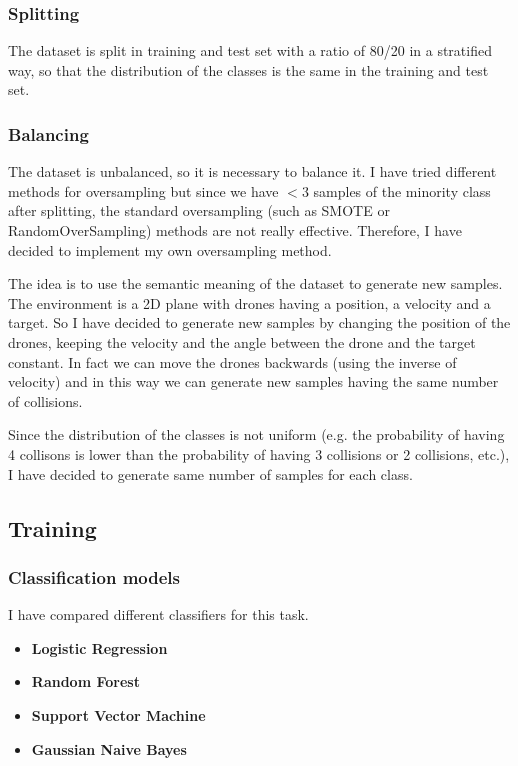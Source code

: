 \subsubsection{Splitting}
\label{sec:preprocessing-splitting}
The dataset is split in training and test set with a ratio of 80/20 in a stratified way, so that the distribution of the classes is the same in the training and test set.

\subsubsection{Balancing}
\label{sec:preprocessing-balancing}
The dataset is unbalanced, so it is necessary to balance it.
I have tried different methods for oversampling but since we have $<3$ samples of the minority class after splitting, the standard oversampling (such as SMOTE or RandomOverSampling) methods are not really effective.
Therefore, I have decided to implement my own oversampling method.

The idea is to use the semantic meaning of the dataset to generate new samples.
The environment is a 2D plane with drones having a position, a velocity and a target.
So I have decided to generate new samples by changing the position of the drones, keeping the velocity and the angle between the drone and the target constant.
In fact we can move the drones backwards (using the inverse of velocity) and in this way we can generate new samples having the same number of collisions.

Since the distribution of the classes is not uniform (e.g. the probability of having 4 collisons is lower than the probability of having 3 collisions or 2 collisions, etc.), I have decided to generate same number of samples for each class.

\subsection{Training}
\label{sec:training}

\subsubsection{Classification models}
\label{sec:training-classifier-selection}
I have compared different classifiers for this task.
\begin{itemize}
    \item \textbf{Logistic Regression}
    \item \textbf{Random Forest}
    \item \textbf{Support Vector Machine}
    \item \textbf{Gaussian Naive Bayes}
\end{itemize}



